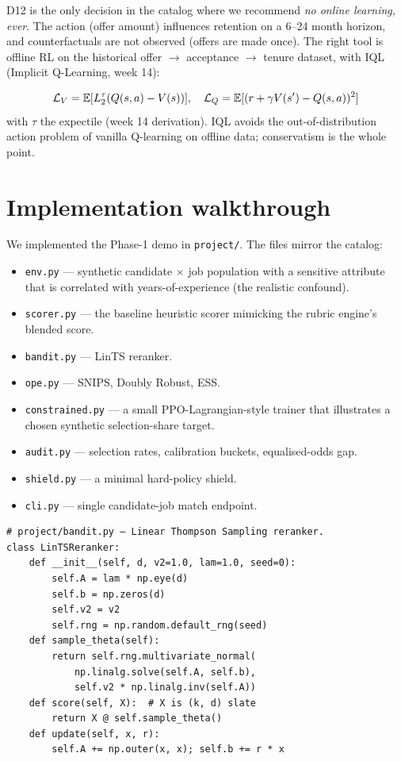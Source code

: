 \documentclass[11pt,oneside]{scrbook}
\begin{document}
D12 is the only decision in the catalog where we recommend \emph{no
online learning, ever}. The action (offer amount) influences retention
on a 6--24 month horizon, and counterfactuals are not observed (offers
are made once). The right tool is offline RL on the historical offer
$\to$ acceptance $\to$ tenure dataset, with IQL (Implicit Q-Learning,
week 14):

\[
\mathcal{L}_V = \mathbb{E}[L_2^{\tau}(Q(s,a) - V(s))], \quad
\mathcal{L}_Q = \mathbb{E}[(r + \gamma V(s') - Q(s,a))^2]
\]
with $\tau$ the expectile (week 14 derivation). IQL avoids the
out-of-distribution action problem of vanilla Q-learning on offline
data; conservatism is the whole point.

\chapter{Implementation walkthrough}

We implemented the Phase-1 demo in \texttt{project/}. The files mirror
the catalog:

\begin{itemize}
  \item \texttt{env.py} --- synthetic candidate $\times$ job
        population with a sensitive attribute that is correlated with
        years-of-experience (the realistic confound).
  \item \texttt{scorer.py} --- the baseline heuristic scorer mimicking
        the rubric engine's blended score.
  \item \texttt{bandit.py} --- LinTS reranker.
  \item \texttt{ope.py} --- SNIPS, Doubly Robust, ESS.
  \item \texttt{constrained.py} --- a small PPO-Lagrangian-style trainer
        that illustrates a chosen synthetic selection-share target.
  \item \texttt{audit.py} --- selection rates, calibration buckets,
        equalised-odds gap.
  \item \texttt{shield.py} --- a minimal hard-policy shield.
  \item \texttt{cli.py} --- single candidate-job match endpoint.
\end{itemize}

\begin{codebox}
\begin{verbatim}
# project/bandit.py — Linear Thompson Sampling reranker.
class LinTSReranker:
    def __init__(self, d, v2=1.0, lam=1.0, seed=0):
        self.A = lam * np.eye(d)
        self.b = np.zeros(d)
        self.v2 = v2
        self.rng = np.random.default_rng(seed)
    def sample_theta(self):
        return self.rng.multivariate_normal(
            np.linalg.solve(self.A, self.b),
            self.v2 * np.linalg.inv(self.A))
    def score(self, X):  # X is (k, d) slate
        return X @ self.sample_theta()
    def update(self, x, r):
        self.A += np.outer(x, x); self.b += r * x
\end{verbatim}
\end{codebox}
\end{document}
